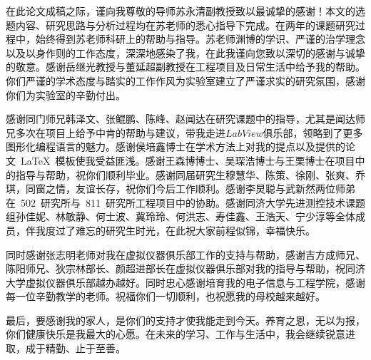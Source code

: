 
在此论文成稿之际，谨向我尊敬的导师苏永清副教授致以最诚挚的感谢！本文的选题内容、研究思路与分析过程均在苏老师的悉心指导下完成。在两年的课题研究过程中，始终得到苏老师科研上的帮助与指导。苏老师渊博的学识、严谨的治学理念以及以身作则的工作态度，深深地感染了我，在此我谨向您致以深切的感谢与诚挚的敬意。感谢岳继光教授与董延超副教授在工程项目及日常生活中给予我的帮助。你们严谨的学术态度与踏实的工作作风为实验室建立了严谨求实的研究氛围，感谢你们为实验室的辛勤付出。

感谢同门师兄韩泽文、张鲲鹏、陈峰、赵闻达在研究课题中的指导，尤其是闻达师兄多次在项目上给予中肯的帮助与建议，带我走进$LabView$俱乐部，领略到了更多图形化编程语言的魅力。感谢侯培鑫博士在学术方法上对我的提点以及提供的论文~\LaTeX~模板使我受益匪浅。感谢王森博博士、吴琛浩博士与王栗博士在项目中的指导与帮助，祝你们顺利毕业。感谢同届研究生穆慧华、陈策、徐刚、张爽、乔琪，同窗之情，友谊长存，祝你们今后工作顺利。感谢李炅聪与武新然两位师弟在~502~研究所与~811~研究所工程项目中的协助。感谢同济大学先进测控技术课题组孙佳妮、林敏静、何士波、冀玲玲、何洪志、寿佳鑫、王浩天、宁少淳等全体成员，伴我度过了难忘的研究生时光，在此祝大家前程似锦，幸福快乐。

同时感谢张志明老师对我在虚拟仪器俱乐部工作的支持与帮助，感谢吉方成师兄、陈阳师兄、狄宗林部长、颜超进部长在虚拟仪器俱乐部对我的指导与帮助，祝同济大学虚拟仪器俱乐部越办越好。同时忠心感谢培育我的电子信息与工程学院，感谢每一位辛勤教学的老师。祝福你们一切顺利，也祝愿我的母校越来越好。

最后，要感谢我的家人，是你们的支持才使我能走到今天。养育之恩，无以为报，你们健康快乐是我最大的心愿。在未来的学习、工作与生活中，我会继续锐意进取，成于精勤、止于至善。


~~\\



